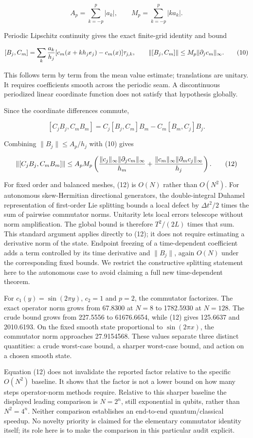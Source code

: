 \[
A_p=\sum_{k=-p}^p|a_k|,\qquad
M_p=\sum_{k=-p}^p|k a_k|. \tag{9}
\]

Periodic Lipschitz continuity gives the exact finite-grid identity and
bound

\[
[B_j,C_m]=\sum_k {a_k\over h_j}
[c_m(x+kh_j e_j)-c_m(x)]\tau_{j,k},\qquad
\|[B_j,C_m]\|\leq M_p\|\partial_j c_m\|_\infty. \tag{10}
\]

This follows term by term from the mean value estimate; translations are
unitary. It requires coefficients smooth across the periodic seam. A
discontinuous periodized linear coordinate function does not satisfy
that hypothesis globally.

Since the coordinate differences commute,

\[
[C_jB_j,C_mB_m]
=C_j[B_j,C_m]B_m-C_m[B_m,C_j]B_j. \tag{11}
\]

Combining \(\|B_j\|\leq A_p/h_j\) with (10) gives

\[
\|[C_jB_j,C_mB_m]\|\leq A_pM_p
\left({\|c_j\|_\infty\|\partial_jc_m\|_\infty\over h_m}
+{\|c_m\|_\infty\|\partial_mc_j\|_\infty\over h_j}\right). \tag{12}
\]

For fixed order and balanced meshes, (12) is \(O(N)\) rather than
\(O(N^2)\). For autonomous skew-Hermitian directional generators, the
double-integral Duhamel representation of first-order Lie splitting
bounds a local defect by \(\Delta t^2/2\) times the sum of pairwise
commutator norms. Unitarity lets local errors telescope without norm
amplification. The global bound is therefore \(T^2/(2L)\) times that
sum. This standard argument applies directly to (12); it does not
require estimating a derivative norm of the state. Endpoint freezing of
a time-dependent coefficient adds a term controlled by its time
derivative and \(\|B_j\|\), again \(O(N)\) under the corresponding fixed
bounds. We restrict the constructive splitting statement here to the
autonomous case to avoid claiming a full new time-dependent theorem.

For \(c_1(y)=\sin(2\pi y)\), \(c_2=1\) and \(p=2\), the commutator
factorizes. The exact operator norm grows from 67.8300 at \(N=8\) to
1782.5930 at \(N=128\). The crude bound grows from 227.5556 to
61676.6654, while (12) gives 125.6637 and 2010.6193. On the fixed smooth
state proportional to \(\sin(2\pi x)\), the commutator norm approaches
27.9154568. These values separate three distinct quantities: a crude
worst-case bound, a sharper worst-case bound, and action on a chosen
smooth state.

Equation (12) does not invalidate the reported factor relative to the
specific \(O(N^2)\) baseline. It shows that the factor is not a lower
bound on how many steps operator-norm methods require. Relative to this
sharper baseline the displayed leading comparison is \(N=2^n\), still
exponential in qubits, rather than \(N^2=4^n\). Neither comparison
establishes an end-to-end quantum/classical speedup. No novelty priority
is claimed for the elementary commutator identity itself; its role here
is to make the comparison in this particular audit explicit.

